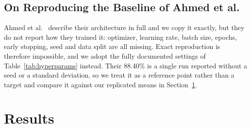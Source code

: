 \documentclass[conference,a4paper]{IEEEtran}
\begin{document}
\begin{table}[htbp]
  \caption{Shared Hyperparameter Configuration}
  \label{tab:hyperparams}
  \centering\footnotesize
  \setlength{\tabcolsep}{3pt}
  \renewcommand{\arraystretch}{1.05}
\end{table}

\subsection{On Reproducing the Baseline of Ahmed et al.}
\label{sec:baseline_repro}

Ahmed et al.~\cite{ahmed2025} describe their architecture in full
and we copy it exactly, but they do not report how they trained
it: optimizer, learning rate, batch size, epochs, early stopping,
seed and data split are all missing. Exact reproduction is
therefore impossible, and we adopt the fully documented settings
of Table~\ref{tab:hyperparams} instead. Their 88.40\% is a single
run reported without a seed or a standard deviation, so we treat
it as a reference point rather than a target and compare it
against our replicated means in Section~\ref{sec:results}.
\FloatBarrier\section{Results}
\label{sec:results}
\end{document}
